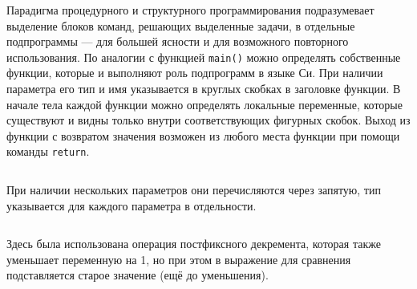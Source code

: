 Парадигма процедурного и структурного программирования подразумевает выделение
блоков команд, решающих выделенные задачи, в отдельные подпрограммы --- для
большей ясности и для возможного повторного использования. По аналогии с
функцией \texttt{main()} можно определять собственные функции, которые и
выполняют роль подпрограмм в языке Си. При наличии параметра его тип и имя
указывается в круглых скобках в заголовке функции. В начале тела каждой
функции можно определять локальные переменные, которые существуют и видны
только внутри соответствующих фигурных скобок. Выход из функции с возвратом
значения возможен из любого места функции при помощи команды \texttt{return}.
%
\inputminted{c}{samples/factorial.c}

При наличии нескольких параметров они перечисляются через запятую, тип
указывается для каждого параметра в отдельности.
%
\inputminted{c}{samples/power.c}

Здесь была использована операция постфиксного декремента, которая также
уменьшает переменную на 1, но при этом в выражение для сравнения подставляется
старое значение (ещё до уменьшения).





